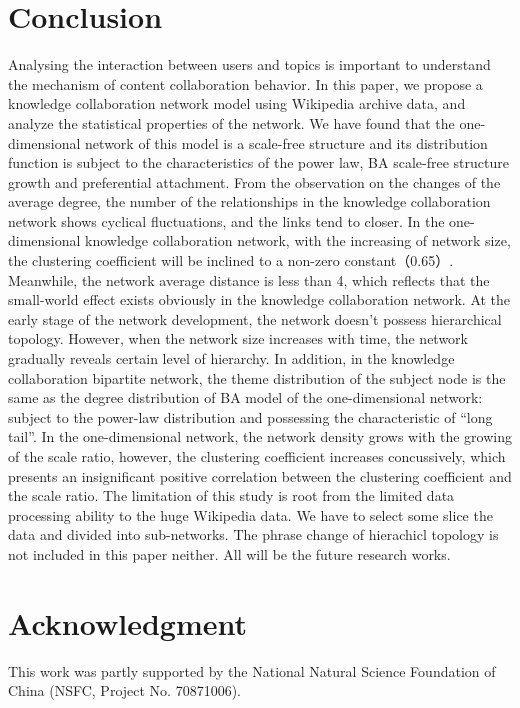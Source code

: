\documentclass{elsarticle}
\begin{document}
\section{Conclusion}
\label{sec:5concl-disc-}

Analysing the interaction between users and topics is important to
understand the mechanism of content collaboration behavior. 
In this paper, we propose a knowledge collaboration network model
using  Wikipedia archive data, and analyze the statistical
properties of the network. We have found that the one-dimensional network of this model is a scale-free structure and its distribution function is subject to the characteristics of the power law, BA scale-free structure growth and preferential attachment. From the observation on the changes of the average degree, the number of the relationships in the knowledge collaboration network shows cyclical fluctuations, and the links tend to closer. In the one-dimensional knowledge collaboration network, with the increasing of network size, the clustering coefficient will be inclined to a non-zero constant（0.65）. Meanwhile, the network average distance is less than 4, which reflects that the small-world effect exists obviously in the knowledge collaboration network. At the early stage of the network development, the network doesn’t possess hierarchical topology. However, when the network size increases with time, the network gradually reveals certain level of hierarchy. In addition, in the knowledge collaboration bipartite network, the theme distribution of the subject node is the same as the degree distribution of BA model of the one-dimensional network: subject to the power-law distribution and possessing the characteristic of “long tail”. In the one-dimensional network, the network density grows with the growing of the scale ratio, however, the clustering coefficient increases concussively, which presents an insignificant positive correlation between the clustering coefficient and the scale ratio. The limitation of this study is root from the
limited data processing ability to the
huge Wikipedia data. We have to select some slice the data and divided
into sub-networks. The
phrase change of hierachicl topology is  not included in this paper
neither. All will be the future research works.  


\section*{Acknowledgment}
\label{sec:acknowledgment}
This work was partly supported by the National Natural Science Foundation of China (NSFC, Project No. 70871006).




\end{document}

